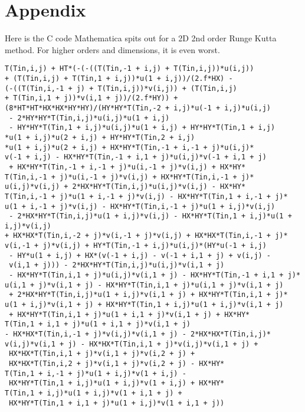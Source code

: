 \documentclass[paper=a4, fontsize=11pt]{scrartcl} %
\numberwithin{equation}{section} %
\numberwithin{figure}{section} %
\numberwithin{table}{section} %
\begin{document}
\section{Appendix}
Here is the C code Mathematica spits out for a 2D 2nd order Runge Kutta method. For higher orders and dimensions, it is even worst.
\begin{verbatim}
T(Tin,i,j) + HT*(-(-((T(Tin,-1 + i,j) + T(Tin,i,j))*u(i,j)) 
+ (T(Tin,i,j) + T(Tin,1 + i,j))*u(1 + i,j))/(2.f*HX) - 
(-((T(Tin,i,-1 + j) + T(Tin,i,j))*v(i,j)) + (T(Tin,i,j) 
+ T(Tin,i,1 + j))*v(i,1 + j))/(2.f*HY)) + 
(8*HT*HT*HX*HX*HY*HY)/(HY*HY*T(Tin,-2 + i,j)*u(-1 + i,j)*u(i,j)
 - 2*HY*HY*T(Tin,i,j)*u(i,j)*u(1 + i,j)
 - HY*HY*T(Tin,1 + i,j)*u(i,j)*u(1 + i,j) + HY*HY*T(Tin,1 + i,j)
*u(1 + i,j)*u(2 + i,j) + HY*HY*T(Tin,2 + i,j)
*u(1 + i,j)*u(2 + i,j) + HX*HY*T(Tin,-1 + i,-1 + j)*u(i,j)*
v(-1 + i,j) - HX*HY*T(Tin,-1 + i,1 + j)*u(i,j)*v(-1 + i,1 + j)
 + HX*HY*T(Tin,-1 + i,-1 + j)*u(i,-1 + j)*v(i,j) + HX*HY*
T(Tin,i,-1 + j)*u(i,-1 + j)*v(i,j) + HX*HY*T(Tin,i,-1 + j)*
u(i,j)*v(i,j) + 2*HX*HY*T(Tin,i,j)*u(i,j)*v(i,j) - HX*HY*
T(Tin,i,-1 + j)*u(1 + i,-1 + j)*v(i,j) - HX*HY*T(Tin,1 + i,-1 + j)*
u(1 + i,-1 + j)*v(i,j) - HX*HY*T(Tin,i,-1 + j)*u(1 + i,j)*v(i,j)
 - 2*HX*HY*T(Tin,i,j)*u(1 + i,j)*v(i,j) - HX*HY*T(Tin,1 + i,j)*u(1 + i,j)*v(i,j) 
+ HX*HX*T(Tin,i,-2 + j)*v(i,-1 + j)*v(i,j) + HX*HX*T(Tin,i,-1 + j)*
v(i,-1 + j)*v(i,j) + HY*T(Tin,-1 + i,j)*u(i,j)*(HY*u(-1 + i,j)
 - HY*u(1 + i,j) + HX*(v(-1 + i,j) - v(-1 + i,1 + j) + v(i,j) -
 v(i,1 + j))) - 2*HX*HY*T(Tin,i,j)*u(i,j)*v(i,1 + j)
 - HX*HY*T(Tin,i,1 + j)*u(i,j)*v(i,1 + j) - HX*HY*T(Tin,-1 + i,1 + j)*
u(i,1 + j)*v(i,1 + j) - HX*HY*T(Tin,i,1 + j)*u(i,1 + j)*v(i,1 + j)
 + 2*HX*HY*T(Tin,i,j)*u(1 + i,j)*v(i,1 + j) + HX*HY*T(Tin,i,1 + j)*
u(1 + i,j)*v(i,1 + j) + HX*HY*T(Tin,1 + i,j)*u(1 + i,j)*v(i,1 + j)
 + HX*HY*T(Tin,i,1 + j)*u(1 + i,1 + j)*v(i,1 + j) + HX*HY*
T(Tin,1 + i,1 + j)*u(1 + i,1 + j)*v(i,1 + j) 
- HX*HX*T(Tin,i,-1 + j)*v(i,j)*v(i,1 + j) - 2*HX*HX*T(Tin,i,j)*
v(i,j)*v(i,1 + j) - HX*HX*T(Tin,i,1 + j)*v(i,j)*v(i,1 + j) +
 HX*HX*T(Tin,i,1 + j)*v(i,1 + j)*v(i,2 + j) +
 HX*HX*T(Tin,i,2 + j)*v(i,1 + j)*v(i,2 + j) - HX*HY*
T(Tin,1 + i,-1 + j)*u(1 + i,j)*v(1 + i,j) -
 HX*HY*T(Tin,1 + i,j)*u(1 + i,j)*v(1 + i,j) + HX*HY*
T(Tin,1 + i,j)*u(1 + i,j)*v(1 + i,1 + j) +
 HX*HY*T(Tin,1 + i,1 + j)*u(1 + i,j)*v(1 + i,1 + j)) 
\end{verbatim}
\end{document}

